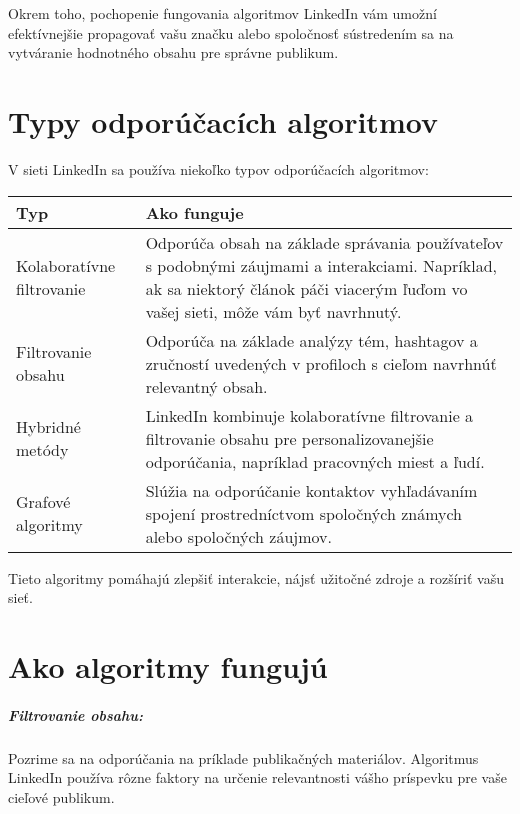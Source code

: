 \documentclass[twoside,slovak,a4paper]{coursepaper}
\begin{document}
Okrem toho, pochopenie fungovania algoritmov LinkedIn vám umožní efektívnejšie propagovať vašu značku alebo spoločnosť sústredením sa na vytváranie hodnotného obsahu pre správne publikum.


\section{Typy odporúčacích algoritmov} \label{Typy}
V sieti LinkedIn sa používa niekoľko typov odporúčacích algoritmov:


\begin{table}[h!]
    \begin{tabularx}{\textwidth}{|>{\centering\arraybackslash}l|X|}
        \hline
        \textbf{Typ} & \textbf{Ako funguje} 
		\\ \hline Kolaboratívne filtrovanie & Odporúča obsah na základe správania používateľov 
		s podobnými záujmami a interakciami. Napríklad, ak sa niektorý článok páči viacerým ľuďom vo vašej sieti, môže vám byť navrhnutý.

		\\ \hline Filtrovanie obsahu & Odporúča na základe analýzy tém, hashtagov a zručností uvedených v profiloch s cieľom navrhnúť relevantný obsah.  
		\\ \hline Hybridné metódy & LinkedIn kombinuje kolaboratívne filtrovanie a filtrovanie obsahu pre personalizovanejšie odporúčania, napríklad pracovných miest a ľudí.
		\\ \hline Grafové algoritmy & Slúžia na odporúčanie kontaktov vyhľadávaním spojení prostredníctvom spoločných známych alebo spoločných záujmov.
		\\ \hline
    \end{tabularx}
    \label{tab:example}
\end{table}

Tieto algoritmy pomáhajú zlepšiť interakcie, nájsť užitočné zdroje a rozšíriť vašu sieť. ~\cite{Kohút:article}

\section{Ako algoritmy fungujú} \label{fungovanie}
\subparagraph{Filtrovanie obsahu:}
Pozrime sa na odporúčania na príklade publikačných materiálov. Algoritmus LinkedIn používa rôzne faktory na určenie relevantnosti vášho príspevku pre vaše cieľové publikum.
\end{document}
